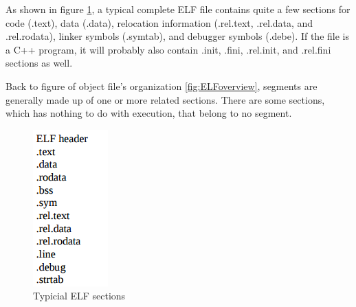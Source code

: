             As shown in figure \ref{fig:ELFsections}, a typical complete ELF file contains quite a few sections for code (.text), data (.data), relocation information (.rel.text, .rel.data, and .rel.rodata), linker symbols (.symtab), and debugger symbols (.debe)\cite{LAL-00}. If the file is a C++ program, it will probably also contain .init, .fini, .rel.init, and .rel.fini sections as well\cite{LAL-00}. 
            
            Back to figure of object file's organization \ref{fig:ELFoverview}, segments are generally made up of one or more related sections. There are some sections, which has nothing to do with execution, that belong to no segment. 
            
            
              \begin{figure}[H]
                \centering
                \includegraphics[scale = 0.6]
                {Images/concepts/ELFsections.png}
                \caption[Typicial ELF sections]%
                {Typicial ELF sections\cite{LAL-00}}    
                \label{fig:ELFsections}
            \end{figure}
           
        
            
